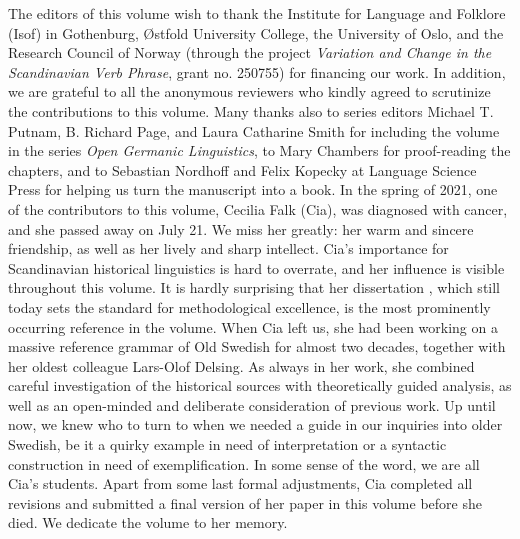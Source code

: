 The editors of this volume wish to thank the Institute for Language and Folklore (Isof) in Gothenburg, Østfold University College, the University of Oslo, and the Research Council of Norway (through the project \textit{Variation and Change in the Scandinavian Verb Phrase}, grant no. 250755) for financing our work. In addition, we are grateful to all the anonymous reviewers who kindly agreed to scrutinize the contributions to this volume. Many thanks also to series editors Michael T. Putnam, B. Richard Page, and Laura Catharine Smith for including the volume in the series \textit{Open Germanic Linguistics}, to Mary Chambers for proof-reading the chapters, and to Sebastian Nordhoff and Felix Kopecky at Language Science Press for helping us turn the manuscript into a book.
In the spring of 2021, one of the contributors to this volume, Cecilia Falk (Cia), was diagnosed with cancer, and she passed away on July 21. We miss her greatly: her warm and sincere friendship, as well as her lively and sharp intellect. Cia’s importance for Scandinavian historical linguistics is hard to overrate, and her influence is visible throughout this volume. It is hardly surprising that her dissertation \citep{Falk1993}, which still today sets the standard for methodological excellence, is the most prominently occurring reference in the volume. When Cia left us, she had been working on a massive reference grammar of Old Swedish for almost two decades, together with her oldest colleague Lars-Olof Delsing. As always in her work, she combined careful investigation of the historical sources with theoretically guided analysis, as well as an open-minded and deliberate consideration of previous work. Up until now, we knew who to turn to when we needed a guide in our inquiries into older Swedish, be it a quirky example in need of interpretation or a syntactic construction in need of exemplification. In some sense of the word, we are all Cia’s students.
Apart from some last formal adjustments, Cia completed all revisions and submitted a final version of her paper in this volume before she died. We dedicate the volume to her memory.
